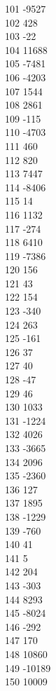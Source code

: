 { 101	-9527 \\
 102	428 \\
 103	-22 \\
 104	11688 \\
 105	-7481 \\
 106	-4203 \\
 107	1544 \\
 108	2861 \\
 109	-115 \\
 110	-4703 \\
 111	460 \\
 112	820 \\
 113	7447 \\
 114	-8406 \\
 115	14 \\
 116	1132 \\
 117	-274 \\
 118	6410 \\
 119	-7386 \\
 120	156 \\
 121	43 \\
 122	154 \\
 123	-340 \\
 124	263 \\
 125	-161 \\
 126	37 \\
 127	40 \\
 128	-47 \\
 129	46 \\
 130	1033 \\
 131	-1224 \\
 132	4026 \\
 133	-3665 \\
 134	2096 \\
 135	-2360 \\
 136	127 \\
 137	1895 \\
 138	-1229 \\
 139	-760 \\
 140	41 \\
 141	5 \\
 142	204 \\
 143	-303 \\
 144	8293 \\
 145	-8024 \\
 146	-292 \\
 147	170 \\
 148	10860 \\
 149	-10189 \\
 150	10009 \\
}
